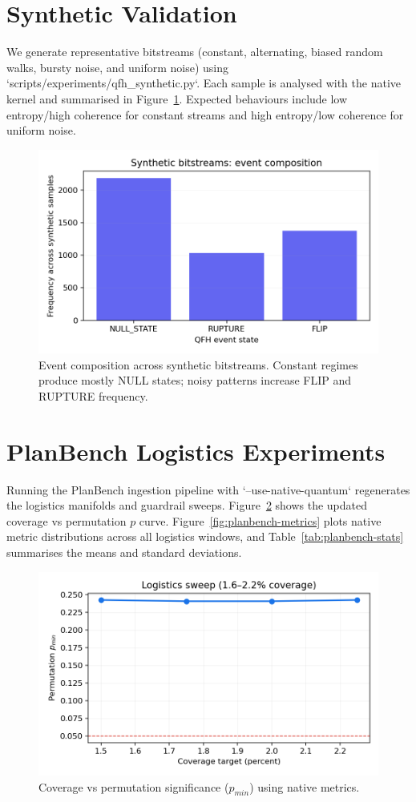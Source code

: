 \documentclass[11pt]{article}
\begin{document}
\section{Synthetic Validation}
We generate representative bitstreams (constant, alternating, biased random walks, bursty noise, and uniform noise) using `scripts/experiments/qfh\_synthetic.py`. Each sample is analysed with the native kernel and summarised in Figure~\ref{fig:synthetic-events}. Expected behaviours include low entropy/high coherence for constant streams and high entropy/low coherence for uniform noise.

\begin{figure}[t]
  \centering
  \includegraphics[width=0.75\linewidth]{../figures/fig0_synthetic_event_hist.png}
  \caption{Event composition across synthetic bitstreams. Constant regimes produce mostly NULL states; noisy patterns increase FLIP and RUPTURE frequency.}
  \label{fig:synthetic-events}
\end{figure}

\section{PlanBench Logistics Experiments}
Running the PlanBench ingestion pipeline with `--use-native-quantum` regenerates the logistics manifolds and guardrail sweeps. Figure~\ref{fig:logistics-sweep} shows the updated coverage vs permutation $p$ curve. Figure~\ref{fig:planbench-metrics} plots native metric distributions across all logistics windows, and Table~\ref{tab:planbench-stats} summarises the means and standard deviations.

\begin{figure}[t]
  \centering
  \includegraphics[width=0.75\linewidth]{../figures/fig1_logistics_sweep.png}
  \caption{Coverage vs permutation significance ($p_{min}$) using native metrics.}
  \label{fig:logistics-sweep}
\end{figure}
\end{document}
